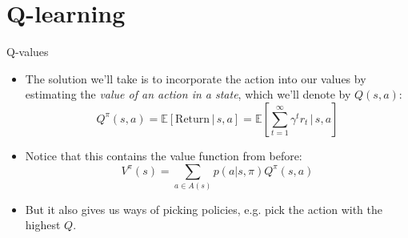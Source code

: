 \documentclass{beamer}
\newcommand{\E}[1]{\mathbb{E}\left[#1\right]}
\begin{document}
\section{Q-learning}


\begin{frame}{Q-values}
\begin{itemize}
\item The solution we'll take is to incorporate the action into our values by estimating the \emph{value of an action in a state}, which we'll denote by \(Q(s,a)\):
    \[Q^\pi(s,a) = \E{\text{Return} \, |\, s, a} = \E{\sum_{t=1}^\infty \gamma^t r_t \, \bigg \vert \, s, a } \]
\item<2-> Notice that this contains the value function from before:
    \[V^\pi(s) = \sum_{a \in A(s)} p(a | s, \pi) Q^{\pi} (s, a)\]
\item<3-> But it also gives us ways of picking policies, e.g. pick the action with the highest \(Q\).
\end{itemize}
\end{frame}
\end{document}
